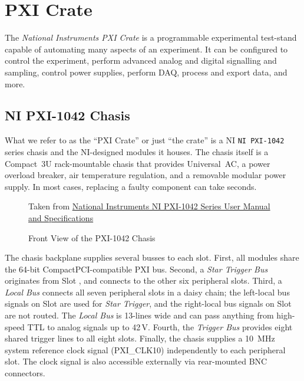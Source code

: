 \section{PXI Crate}
\label{sec:eq_pxi}

The \textit{National Instruments \gls{PXI Crate}} is a programmable experimental test-stand capable of automating many aspects of an experiment.  It can be configured to control the experiment, perform advanced analog and digital signalling and sampling, control power supplies, perform \gls{DAQ}, process and export data, and more.

\subsection{NI PXI-1042 Chasis}
\label{sec:eq_pxi:chasis}

What we refer to as the ``PXI Crate'' or just ``the crate'' is a \gls{NI} \texttt{NI PXI-1042} series chasis and the \gls{NI}-designed modules it houses.  The chasis itself is a Compact~3U rack-mountable chasis that provides Universal~AC, a power overload breaker, air temperature regulation, and a removable modular power supply.  In most cases, replacing a faulty component can take seconds.

\begin{figure}[htbp]
  \centering
  {\tiny
    Taken from \href{Manuals/NI PXI-1042 Series User Manual and Specifications}{National Instruments NI PXI-1042 Series User Manual and Specifications}
  }
  \caption{Front View of the PXI-1042 Chasis}
  \label{fig:eq_pxi:chasis_front}
\end{figure}

The chasis backplane supplies several busses to each slot.  First, all modules share the 64-bit CompactPCI-compatible PXI bus.  Second, a \textit{Star Trigger Bus} originates from Slot \pxislottwo, and connects to the other six peripheral slots.  Third, a \textit{Local Bus} connects all seven peripheral slots in a daisy chain; the left-local bus signals on Slot \pxislottwo are used for \textit{Star Trigger}, and the right-local bus signals on Slot  are not routed.  The \textit{Local Bus} is 13-lines wide and can pass anything from high-speed TTL to analog signals up to 42\,V.  Fourth, the \textit{Trigger Bus} provides eight shared trigger lines to all eight slots.  Finally, the chasis supplies a 10~MHz system reference clock signal (PXI\_CLK10) independently to each peripheral slot.  The clock signal is also accessible externally via rear-mounted BNC connectors.


